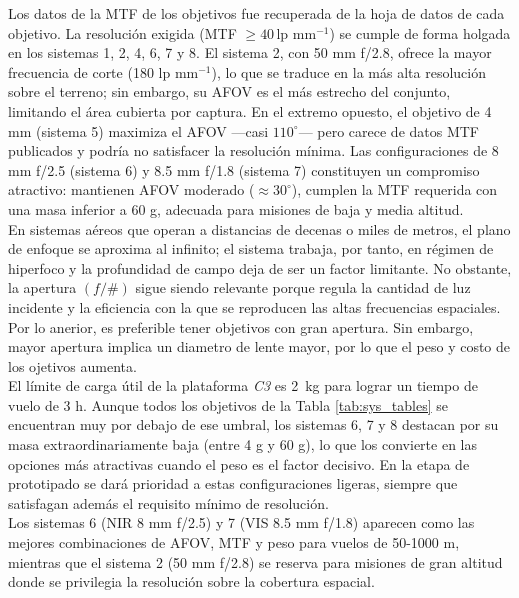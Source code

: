 Los datos de la MTF de los objetivos fue recuperada de la hoja de datos de cada objetivo. La resolución exigida (MTF $\geq40\,$lp mm\(^{-1}\)) se cumple de forma holgada en
los sistemas 1, 2, 4, 6, 7 y 8.  El sistema 2, con 50 mm f/2.8, ofrece la mayor
frecuencia de corte (180 lp mm\(^{-1}\)), lo que se traduce en la más alta
resolución sobre el terreno; sin embargo, su AFOV es el más estrecho del
conjunto, limitando el área cubierta por captura.  En el extremo opuesto, el
objetivo de 4 mm (sistema 5) maximiza el AFOV —casi \(110^{\circ}\)— pero carece de datos MTF publicados y podría no satisfacer la
resolución mínima.  Las configuraciones de 8 mm f/2.5 (sistema 6) y
8.5 mm f/1.8 (sistema 7) constituyen un compromiso atractivo: mantienen AFOV
moderado ($\approx30^{\circ}$), cumplen la MTF requerida con una masa inferior a 60 g, adecuada para misiones de baja y media
altitud.\\


En sistemas aéreos que operan a distancias de decenas o miles de metros, el plano de enfoque se aproxima al infinito; el sistema trabaja, por tanto, en régimen de hiperfoco y la profundidad de campo deja de ser un factor limitante.  No obstante, la apertura \((f/\#)\) sigue siendo relevante porque regula la cantidad de luz incidente y la eficiencia con la que se reproducen las altas frecuencias espaciales. Por lo anerior, es preferible tener objetivos con gran apertura. Sin embargo, mayor apertura implica un diametro de lente mayor, por lo que el peso y costo de los ojetivos aumenta. \\

El límite de carga útil de la plataforma \textit{C3} es 2 kg para lograr un tiempo de vuelo de 3 h. Aunque todos los objetivos de la Tabla \ref{tab:sys_tables} se encuentran muy por debajo de ese umbral, los sistemas 6, 7 y 8 destacan por su masa extraordinariamente baja (entre 4 g y 60 g), lo que los convierte en las opciones más atractivas cuando el peso es el factor decisivo. En la etapa de prototipado se dará prioridad a estas configuraciones ligeras, siempre que satisfagan además el requisito mínimo de resolución.\\


Los sistemas 6 (NIR 8 mm f/2.5) y 7 (VIS 8.5 mm f/1.8) aparecen
como las mejores combinaciones de AFOV, MTF y peso para vuelos de 50-1000 m,
mientras que el sistema 2 (50 mm f/2.8) se reserva para misiones de gran
altitud donde se privilegia la resolución sobre la cobertura espacial.\\

